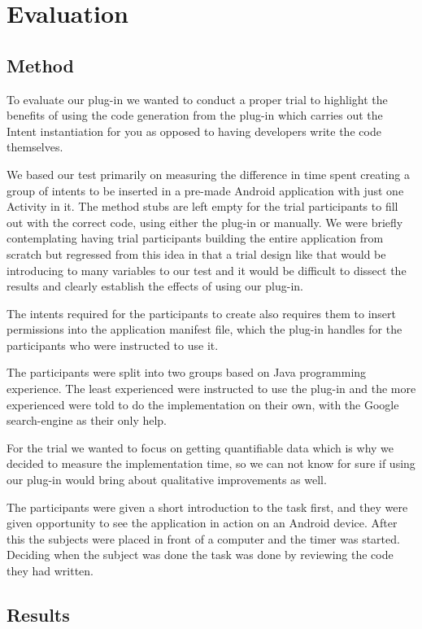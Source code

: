 \section{Evaluation}
\subsection{Method}
To evaluate our plug-in we wanted to conduct a proper trial to highlight the benefits of using the code generation from the plug-in which carries out the Intent instantiation for you as opposed to having developers write the code themselves.

We based our test primarily on measuring the difference in time spent creating a group of intents to be inserted in a pre-made Android application with just one Activity in it. The method stubs are left empty for the trial participants to fill out with the correct code, using either the plug-in or manually. We were briefly contemplating having trial participants building the entire application from scratch but regressed from this idea in that a trial design like that would be introducing to many variables to our test and it would be difficult to dissect the results and clearly establish the effects of using our plug-in.

The intents required for the participants to create also requires them to insert permissions into the application manifest file, which the plug-in handles for the participants who were instructed to use it.

The participants were split into two groups based on Java programming experience. The least experienced were instructed to use the plug-in and the more experienced were told to do the implementation on their own, with the Google search-engine as their only help.

For the trial we wanted to focus on getting quantifiable data which is why we decided to measure the implementation time, so we can not know for sure if using our plug-in would bring about qualitative improvements as well.

The participants were given a short introduction to the task first, and they were given opportunity to see the application in action on an Android device. After this the subjects were placed in front of a computer and the timer was started. Deciding when the subject was done the task was done by reviewing the code they had written.


\subsection{Results}
